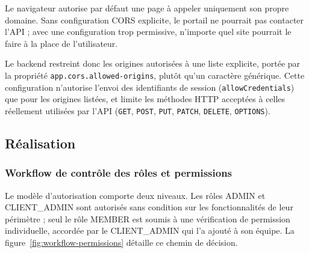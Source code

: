 Le navigateur autorise par défaut une page à appeler uniquement son propre domaine. Sans configuration CORS explicite, le portail ne pourrait pas contacter l'API ; avec une configuration trop permissive, n'importe quel site pourrait le faire à la place de l'utilisateur.

Le backend restreint donc les origines autorisées à une liste explicite, portée par la propriété \texttt{app.cors.allowed-origins}, plutôt qu'un caractère générique. Cette configuration n'autorise l'envoi des identifiants de session (\texttt{allowCredentials}) que pour les origines listées, et limite les méthodes HTTP acceptées à celles réellement utilisées par l'API (\texttt{GET}, \texttt{POST}, \texttt{PUT}, \texttt{PATCH}, \texttt{DELETE}, \texttt{OPTIONS}).

\subsection{Réalisation}

\subsubsection{Workflow de contrôle des rôles et permissions}

Le modèle d'autorisation comporte deux niveaux. Les rôles ADMIN et CLIENT\_ADMIN sont autorisés sans condition sur les fonctionnalités de leur périmètre ; seul le rôle MEMBER est soumis à une vérification de permission individuelle, accordée par le CLIENT\_ADMIN qui l'a ajouté à son équipe. La figure~\ref{fig:workflow-permissions} détaille ce chemin de décision.

